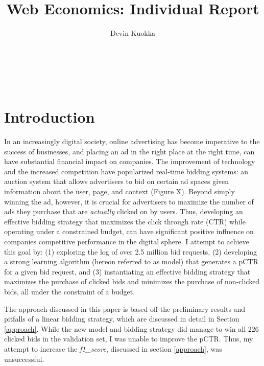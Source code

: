 \documentclass{sig-alternate-05-2015}
\begin{document}

\title{Web Economics: Individual Report}

\author{
\alignauthor
Devin Kuokka\\
      \\
      \\
      \\
      \\
}
\maketitle

\section{Introduction}
In an increasingly digital society, online advertising has become imperative to the success of businesses, and placing an ad in the right place at the right time, can have substantial financial impact on companies.  The improvement of technology and the increased competition have popularized real-time bidding systems: an auction system that allows advertisers to bid on certain ad spaces given information about the user, page, and context (Figure X). Beyond simply winning the ad, however, it is crucial for advertisers to maximize the number of ads they purchase that are \emph{actually} clicked on by users. Thus, developing an effective bidding strategy that maximizes the click through rate (CTR) while operating under a constrained budget, can have significant positive influence on companies competitive performance in the digital sphere. I attempt to achieve this goal by: (1) exploring the log of over 2.5 million bid requests, (2) developing a strong learning algorithm (hereon referred to as model) that generates a pCTR for a given bid request, and (3) instantiating an effective bidding strategy that maximizes the purchase of clicked bids and minimizes the purchase of non-clicked bids, all under the constraint of a budget.

The approach discussed in this paper is based off the preliminary results and pitfalls of a linear bidding strategy, which are discussed in detail in Section \ref{approach}.  While the new model and bidding strategy did manage to win all 226 clicked bids in the validation set, I was unable to improve the pCTR.  Thus, my attempt to increase the \textit{f1\_score}, discussed in section \ref{approach}, was unsuccessful.
\end{document}
